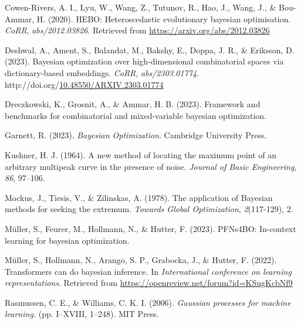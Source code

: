 \documentclass[12pt,twoside]{reedthesis}
\newlength{\cslhangindent}
\newenvironment{CSLReferences}[2] %
 {%
  \setlength{\parindent}{0pt}
  \ifodd #1 \everypar{\setlength{\hangindent}{\cslhangindent}}\ignorespaces\fi
  \ifnum #2 > 0
  \setlength{\parskip}{#2\baselineskip}
  \fi
 }%
 {}
\begin{document}
\hypertarget{refs}{}
\begin{CSLReferences}{1}{0}
\leavevmode{}%
Cowen-Rivers, A. I., Lyu, W., Wang, Z., Tutunov, R., Hao, J., Wang, J., \& Bou-Ammar, H. (2020). {HEBO:} Heteroscedastic evolutionary bayesian optimisation. \emph{CoRR}, \emph{abs/2012.03826}. Retrieved from \url{https://arxiv.org/abs/2012.03826}

\leavevmode{}%
Deshwal, A., Ament, S., Balandat, M., Bakshy, E., Doppa, J. R., \& Eriksson, D. (2023). Bayesian optimization over high-dimensional combinatorial spaces via dictionary-based embeddings. \emph{CoRR}, \emph{abs/2303.01774}. http://doi.org/\href{https://doi.org/10.48550/ARXIV.2303.01774}{10.48550/ARXIV.2303.01774}

\leavevmode{}%
Dreczkowski, K., Grosnit, A., \& Ammar, H. B. (2023). Framework and benchmarks for combinatorial and mixed-variable bayesian optimization.

\leavevmode{}%
Garnett, R. (2023). \emph{{Bayesian Optimization}}. Cambridge University Press.

\leavevmode{}%
Kushner, H. J. (1964). A new method of locating the maximum point of an arbitrary multipeak curve in the presence of noise. \emph{Journal of Basic Engineering}, \emph{86}, 97--106.

\leavevmode{}%
Mockus, J., Tiesis, V., \& Zilinskas, A. (1978). The application of {B}ayesian methods for seeking the extremum. \emph{Towards Global Optimization}, \emph{2}(117-129), 2.

\leavevmode{}%
Müller, S., Feurer, M., Hollmann, N., \& Hutter, F. (2023). PFNs4BO: In-context learning for bayesian optimization.

\leavevmode{}%
Müller, S., Hollmann, N., Arango, S. P., Grabocka, J., \& Hutter, F. (2022). Transformers can do bayesian inference. In \emph{International conference on learning representations}. Retrieved from \url{https://openreview.net/forum?id=KSugKcbNf9}

\leavevmode{}%
Rasmussen, C. E., \& Williams, C. K. I. (2006). \emph{Gaussian processes for machine learning.} (pp. I--XVIII, 1--248). MIT Press.


\end{CSLReferences}
\end{document}

